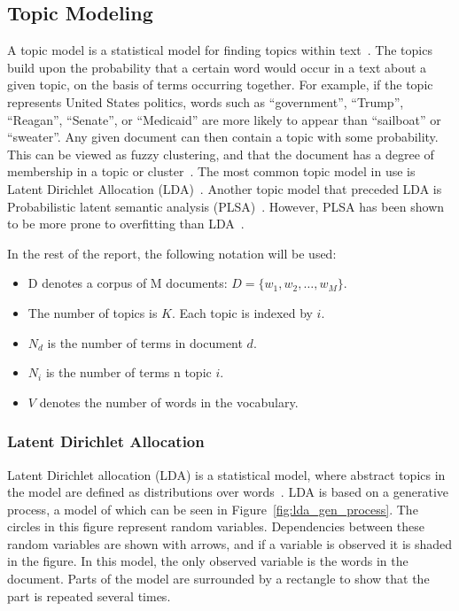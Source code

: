 \subsection{Topic Modeling}\label{sec:topic-modeling}

A topic model is a statistical model for finding topics within text~\cite{crain2012dimensionality}.
The topics build upon the probability that a certain word would occur in a text about a given topic, on the basis of terms occurring together.
For example, if the topic represents United States politics, words such as ``government'', ``Trump'', ``Reagan'', ``Senate'', or ``Medicaid'' are more likely to appear than ``sailboat'' or ``sweater''.
Any given document can then contain a topic with some probability.
This can be viewed as fuzzy clustering, and that the document has a degree of membership in a topic or cluster~\cite{crain2012dimensionality}.
The most common topic model in use is Latent Dirichlet Allocation (LDA)~\cite{crain2012dimensionality}.
Another topic model that preceded LDA is Probabilistic latent semantic analysis (PLSA)~\cite{hofmann1999probabilistic}.
However, PLSA has been shown to be more prone to overfitting than LDA~\cite{crain2012dimensionality}.

In the rest of the report, the following notation will be used:

\begin{itemize}
    \item D denotes a corpus of M documents: $D = \{w_1, w_2, \ldots, w_M\}$.
    \item The number of topics is $K$. Each topic is indexed by $i$.
    \item $N_d$ is the number of terms in document $d$.
    \item $N_i$ is the number of terms n topic $i$.
    \item $V$ denotes the number of words in the vocabulary.
\end{itemize}

\subsubsection{Latent Dirichlet Allocation}

Latent Dirichlet allocation (LDA) is a statistical model, where abstract topics in the model are defined as distributions over words~\cite{blei2003latent}.
LDA is based on a generative process, a model of which can be seen in Figure~\ref{fig:lda_gen_process}.
The circles in this figure represent random variables.
Dependencies between these random variables are shown with arrows, and if a variable is observed it is shaded in the figure.
In this model, the only observed variable is the words in the document.
Parts of the model are surrounded by a rectangle to show that the part is repeated several times.

